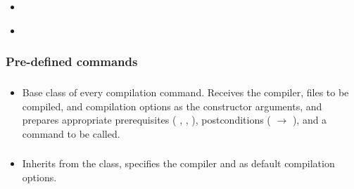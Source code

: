 \begin{itemize}[label={}]
    \item {} \label{sec:get_user} 

    \item {} \label{sec:get_group} 
\end{itemize}

\subsubsection{Pre-defined commands}\label{subsec:predefined_commands}

\subsubsection*{}\label{subsec:CompileBase}

\begin{itemize}[label={}]
    \item Base class of every compilation command.
          Receives the compiler, files to be compiled, and compilation options as the constructor arguments, and prepares
          appropriate prerequisites (
          \hyperref[subsec:ProgramExistsPrerequisite]{},
          \hyperref[subsec:FileExistsPrerequisite]{},
          \hyperref[subsec:NonEmptyListPrerequisite]{}
          ), postconditions (
          \hyperref[subsec:ExitCodePostcondition]{} $\rightarrow$ 
          ), and a command to be called.
\end{itemize}

\subsubsection*{}\label{subsec:CompileNasm}

\begin{itemize}[label={}]
    \item Inherits from the \hyperref[subsec:CompileBase]{} class, specifies the 
          compiler and  as default compilation options.
\end{itemize}

